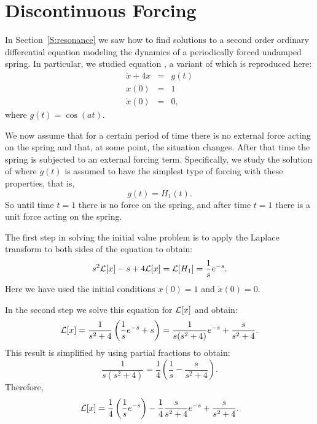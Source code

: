 \documentclass{ximera}
\begin{document}
\section{Discontinuous Forcing} \label{S:13.4}


In Section~\ref{S:resonance} we saw how to find solutions to a second 
order ordinary differential equation modeling the dynamics of a periodically
forced undamped spring.  
In particular, we studied equation , a variant of 
which is reproduced here:
\begin{equation}  \label{eq:ivH1}
\begin{array}{rcl}
   \ddot{x} + 4x & = & g(t) \\
    x(0) & = & 1 \\
    \dot{x}(0) & = & 0,
\end{array}
\end{equation}
where $g(t)=\cos(at)$.

We now assume that for a certain period of time there is no external 
force
acting on the spring and that, at some point, the situation changes. 
After that time the spring is subjected to an external forcing term.  
Specifically, we study the solution of  where $g(t)$ is 
assumed to have the simplest type of forcing with these properties, 
that is,  
\begin{equation}  \label{eq:Heavy1}
g(t) = H_1(t). 
\end{equation}
So until time $t=1$ there is no force on the spring, and after time $t=1$
there is a unit force acting on the spring.

The first step in solving the initial value problem  is to 
apply the Laplace transform to both sides of the equation to obtain:
\[
s^2{\cal L}[x]-s + 4{\cal L}[x] = {\cal L}[H_1] = \frac{1}{s}e^{-s}.
\]
Here we have used the initial conditions $x(0)=1$ and $\dot{x}(0)=0$.

In the second step we solve this equation for ${\cal L}[x]$ and obtain: 
\[
{\cal L}[x] = \frac{1}{s^2+4}\left( \frac{1}{s}e^{-s}+s\right)
=\frac{1}{s(s^2+4)}e^{-s}+\frac{s}{s^2+4}.
\]
This result is simplified by using partial fractions to obtain:
\[
\frac{1}{s(s^2+4)}=\frac{1}{4}\left(\frac{1}{s}-\frac{s}{s^2+4}\right).
\]
Therefore,
\[
{\cal L}[x] = \frac{1}{4}\left(\frac{1}{s}e^{-s}\right) -
\frac{1}{4}\frac{s}{s^2+4}e^{-s} + \frac{s}{s^2+4}.
\]
\end{document}
